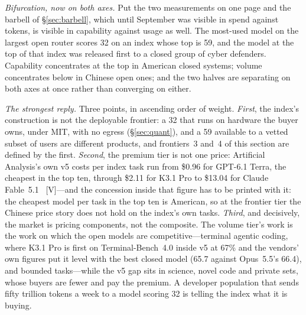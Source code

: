\emph{Bifurcation, now on both axes.} Put the two measurements on one page and the barbell of \S\ref{sec:barbell}, which until September was visible in spend against tokens, is visible in capability against usage as well. The most-used model on the largest open router scores 32 on an index whose top is 59, and the model at the top of that index was released first to a closed group of cyber defenders. Capability concentrates at the top in American closed systems; volume concentrates below in Chinese open ones; and the two halves are separating on both axes at once rather than converging on either.

\emph{The strongest reply.} Three points, in ascending order of weight. \emph{First}, the index's construction is not the deployable frontier: a 32 that runs on hardware the buyer owns, under MIT, with no egress (\S\ref{sec:quant}), and a 59 available to a vetted subset of users are different products, and frontiers~3 and~4 of this section are defined by the first. \emph{Second}, the premium tier is not one price: Artificial Analysis's own v5 costs per index task run from \$0.96 for GPT-6.1 Terra, the cheapest in the top ten, through \$2.11 for K3.1 Pro to \$13.04 for Claude Fable~5.1~\cite{mdl-aa-v5,mdl-kimi-k31} [V]---and the concession inside that figure has to be printed with it: the cheapest model per task in the top ten is American, so at the frontier tier the Chinese price story does not hold on the index's own tasks. \emph{Third}, and decisively, the market is pricing components, not the composite. The volume tier's work is the work on which the open models are competitive---terminal agentic coding, where K3.1 Pro is first on Terminal-Bench~4.0 inside v5 at 67\% and the vendors' own figures put it level with the best closed model (65.7 against Opus~5.5's 66.4), and bounded tasks---while the v5 gap sits in science, novel code and private sets, whose buyers are fewer and pay the premium. A developer population that sends fifty trillion tokens a week to a model scoring 32 is telling the index what it is buying.


